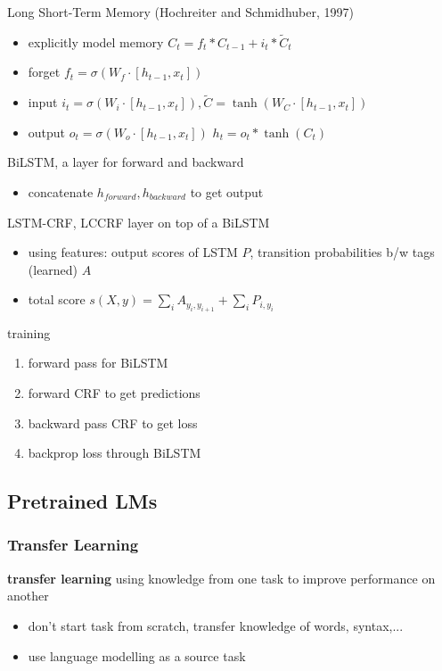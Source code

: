 \documentclass[]{article}
\theoremstyle{definition}
\begin{document}
Long Short-Term Memory (Hochreiter and Schmidhuber, 1997)
\begin{itemize}
    \item explicitly model memory $C_t = f_t * C_{t-1} + i_t * \tilde C_t$
    \item forget $f_t = \sigma(W_f \cdot [h_{t-1},x_t]) $
    \item input $i_t = \sigma(W_i \cdot [h_{t-1},x_t]), \tilde C = \tanh (W_C \cdot [h_{t-1}, x_t])  $
    \item output $o_t = \sigma(W_o \cdot [h_{t-1},x_t])$
        $h_t = o_t * \tanh(C_t)$
\end{itemize}

BiLSTM, a layer for forward and backward
\begin{itemize}
    \item concatenate $h_{forward},h_{backward}$ to get output
\end{itemize}

LSTM-CRF, LCCRF layer on top of a BiLSTM
\begin{itemize}
    \item using features: output scores of LSTM $P$, transition probabilities b/w tags (learned) $A$
    \item total score $s(X,y) = \sum_i A_{y_i,y_{i+1}} + \sum_i P_{i,y_i}$
\end{itemize}

training
\begin{enumerate}
    \item forward pass for BiLSTM
    \item forward CRF to get predictions
    \item backward pass CRF to get loss
    \item backprop loss through BiLSTM
\end{enumerate}

\subsection{Pretrained LMs}%
\label{sub:pretrained_lms}

\subsubsection{Transfer Learning}%
\label{ssub:transfer_learning}

\textbf{transfer learning} using knowledge from one task to improve performance on another
\begin{itemize}
    \item don't start task from scratch, transfer knowledge of words, syntax,...
    \item use language modelling as a source task
\end{itemize}
\end{document}
